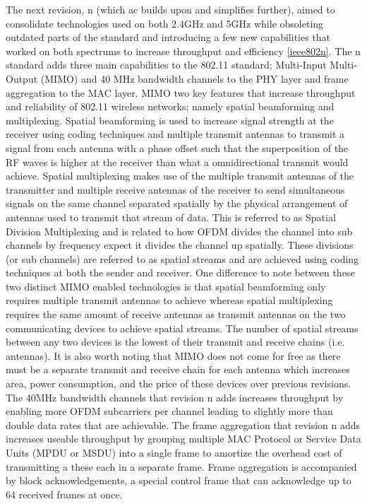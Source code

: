 The next revision, n (which ac builds upon and simplifies further), aimed to consolidate technologies used on both 2.4GHz and 5GHz while obsoleting outdated parts of the standard and introducing a few new capabilities that worked on both spectrums to increase throughput and efficiency \ref{ieee802n}. The n standard adds three main capabilities to the 802.11 standard; Multi-Input Multi-Output (MIMO) and 40 MHz bandwidth channels to the PHY layer and frame aggregation to the MAC layer. MIMO two key features that increase throughput and reliability of 802.11 wireless networks; namely spatial beamforming and multiplexing. Spatial beamforming is used to increase signal strength at the receiver using coding techniques and multiple transmit antennas to transmit a signal from each antenna with a phase offset such that the superposition of the RF waves is higher at the receiver than what a omnidirectional transmit would achieve. Spatial multiplexing makes use of the multiple transmit antennas of the transmitter and multiple receive antennas of the receiver to send  simultaneous signals on the same channel separated spatially by the physical arrangement of antennas used to transmit that stream of data. This is referred to as Spatial Division Multiplexing and is related to how OFDM divides the channel into sub channels by frequency expect it divides the channel up spatially. These divisions (or sub channels) are referred to as spatial streams and are achieved using coding techniques at both the sender and receiver. One difference to note between these two distinct MIMO enabled technologies is that spatial beamforming only requires multiple transmit antennas to achieve whereas spatial multiplexing requires the same amount of receive antennas as transmit antennas on the two communicating devices to achieve spatial streams. The number of spatial streams between any two devices is the lowest of their transmit and receive chains (i.e. antennas). It is also worth noting that MIMO does not come for free as there must be a separate transmit and receive chain for each antenna which increases area, power consumption, and the price of these devices over previous revisions. The 40MHz bandwidth channels that revision n adds increases throughput by enabling more OFDM subcarriers per channel leading to slightly more than double data rates that are achievable. The frame aggregation that revision n adds increases useable throughput by grouping multiple MAC Protocol or Service Data Units (MPDU or MSDU) into a single frame to amortize the overhead cost of transmitting a these each in a separate frame. Frame aggregation is accompanied by block acknowledgements, a special control frame that can acknowledge up to 64 received frames at once.

